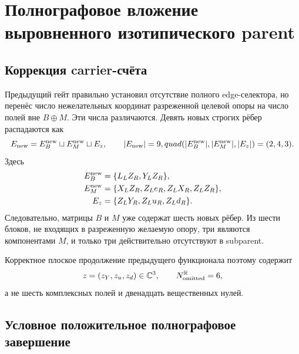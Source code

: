 \chapter{Полнографовое вложение выровненного изотипического parent}
\label{ch:v8-baryon-c0-isotypic-channel-full-graph-aligned-parent}

\section{Коррекция carrier-счёта}

Предыдущий гейт правильно установил отсутствие полного edge-селектора, но
перенёс число нежелательных координат разреженной целевой опоры на число
полей вне $B\oplus M$. Эти числа различаются. Девять новых строгих рёбер
распадаются как
\begin{equation}
 E_{\rm new}=E_B^{\rm new}\sqcup E_M^{\rm new}\sqcup E_z,
 \qquad |E_{\rm new}|=9,quad (|E_B^{\rm new}|,|E_M^{\rm new}|,|E_z|)=(2,4,3).
 \label{eq:v8-full-graph-aligned-edge-decomposition}
\end{equation}
Здесь
\begin{align}
 E_B^{\rm new}&=\{L_LZ_R,Y_LZ_R\},\nonumber\\
 E_M^{\rm new}&=\{X_LZ_R,Z_Le_R,Z_LX_R,Z_LZ_R\},\nonumber\\
 E_z&=\{Z_LY_R,Z_Lu_R,Z_Ld_R\}.
 \label{eq:v8-full-graph-aligned-edge-sets}
\end{align}
Следовательно, матрицы $B$ и $M$ уже содержат шесть новых рёбер. Из шести
блоков, не входящих в разреженную желаемую опору, три являются компонентами
$M$, и только три действительно отсутствуют в subparent.

Корректное плоское продолжение предыдущего функционала поэтому содержит
\begin{equation}
 z=(z_Y,z_u,z_d)\in\mathbb C^3,
 \qquad
 N_{\rm omitted}^{\mathbb R}=6,
 \label{eq:v8-full-graph-aligned-correct-flat-count}
\end{equation}
а не шесть комплексных полей и двенадцать вещественных нулей.

\section{Условное положительное полнографовое завершение}

